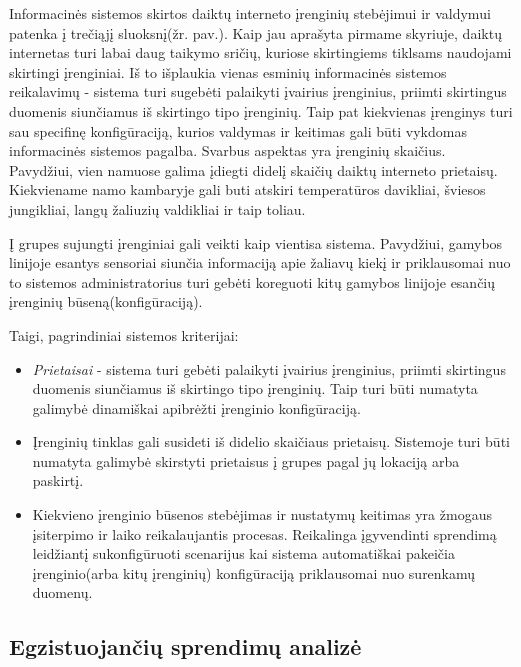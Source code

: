 \documentclass{VUMIFInfBakalaurinis}
\begin{document}
Informacinės sistemos skirtos daiktų interneto įrenginių stebėjimui ir valdymui patenka į trečiąjį sluoksnį(žr. pav.).
Kaip jau aprašyta pirmame skyriuje, daiktų internetas turi labai daug taikymo sričių, kuriose skirtingiems tiklsams naudojami skirtingi įrenginiai.
Iš to išplaukia vienas esminių informacinės sistemos reikalavimų - sistema turi sugebėti palaikyti įvairius įrenginius, priimti skirtingus duomenis siunčiamus iš skirtingo tipo įrenginių.
Taip pat kiekvienas įrenginys turi sau specifinę konfigūraciją, kurios valdymas ir keitimas gali būti vykdomas informacinės sistemos pagalba.
Svarbus aspektas yra įrenginių skaičius. Pavydžiui, vien namuose galima įdiegti didelį skaičių daiktų interneto prietaisų. Kiekviename namo kambaryje gali buti atskiri temperatūros davikliai, šviesos jungikliai, langų žaliuzių valdikliai ir taip toliau.
\par Į grupes sujungti įrenginiai gali veikti kaip vientisa sistema. Pavydžiui, gamybos linijoje esantys sensoriai siunčia informaciją apie žaliavų kiekį ir priklausomai nuo to sistemos administratorius turi gebėti koreguoti kitų gamybos linijoje esančių įrenginių būseną(konfigūraciją). 

\par Taigi, pagrindiniai sistemos kriterijai:
\begin{itemize}
  \item \emph{Prietaisai} - sistema turi gebėti palaikyti įvairius įrenginius, priimti skirtingus duomenis siunčiamus iš skirtingo tipo įrenginių. Taip turi būti numatyta galimybė dinamiškai
  apibrėžti įrenginio konfigūraciją.
  \item Įrenginių tinklas gali susideti iš didelio skaičiaus prietaisų. Sistemoje turi būti numatyta galimybė skirstyti prietaisus į grupes pagal jų lokaciją arba paskirtį.
  \item Kiekvieno įrenginio būsenos stebėjimas ir nustatymų keitimas yra žmogaus įsiterpimo ir laiko reikalaujantis procesas.
    Reikalinga įgyvendinti sprendimą leidžiantį sukonfigūruoti scenarijus kai sistema automatiškai pakeičia įrenginio(arba kitų įrenginių) konfigūraciją priklausomai nuo surenkamų duomenų.
\end{itemize}


\subsection{Egzistuojančių sprendimų analizė}
\end{document}
